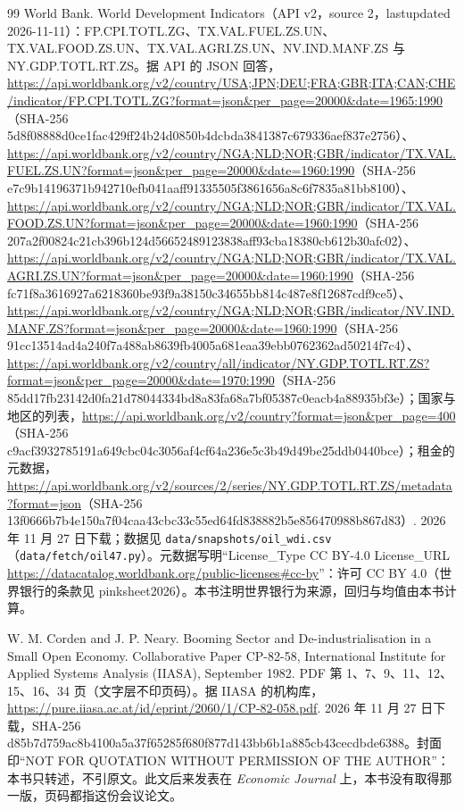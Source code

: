 \begin{thebibliography}{99}
 World Bank. World Development Indicators（API v2，source 2，lastupdated 2026-11-11）：FP.CPI.TOTL.ZG、TX.VAL.FUEL.ZS.UN、TX.VAL.FOOD.ZS.UN、TX.VAL.AGRI.ZS.UN、NV.IND.MANF.ZS 与 NY.GDP.TOTL.RT.ZS。据 API 的 JSON 回答，\url{https://api.worldbank.org/v2/country/USA;JPN;DEU;FRA;GBR;ITA;CAN;CHE/indicator/FP.CPI.TOTL.ZG?format=json&per_page=20000&date=1965:1990}（SHA-256 5d8f08888d0ce1fac429ff24b24d0850b4dcbda3841387c679336aef837e2756）、\url{https://api.worldbank.org/v2/country/NGA;NLD;NOR;GBR/indicator/TX.VAL.FUEL.ZS.UN?format=json&per_page=20000&date=1960:1990}（SHA-256 e7c9b14196371b942710efb041aaff91335505f3861656a8c6f7835a81bb8100）、\url{https://api.worldbank.org/v2/country/NGA;NLD;NOR;GBR/indicator/TX.VAL.FOOD.ZS.UN?format=json&per_page=20000&date=1960:1990}（SHA-256 207a2f00824c21cb396b124d56652489123838aff93cba18380cb612b30afc02）、\url{https://api.worldbank.org/v2/country/NGA;NLD;NOR;GBR/indicator/TX.VAL.AGRI.ZS.UN?format=json&per_page=20000&date=1960:1990}（SHA-256 fc71f8a3616927a6218360be93f9a38150c34655bb814c487e8f12687cdf9ce5）、\url{https://api.worldbank.org/v2/country/NGA;NLD;NOR;GBR/indicator/NV.IND.MANF.ZS?format=json&per_page=20000&date=1960:1990}（SHA-256 91cc13514ad4a240f7a488ab8639fb4005a681eaa39ebb0762362ad50214f7c4）、\url{https://api.worldbank.org/v2/country/all/indicator/NY.GDP.TOTL.RT.ZS?format=json&per_page=20000&date=1970:1990}（SHA-256 85dd17fb23142d0fa21d78044334bd8a83fa68a7bf05387c0eacb4a88935bf3e）；国家与地区的列表，\url{https://api.worldbank.org/v2/country?format=json&per_page=400}（SHA-256 c9acf3932785191a649cbc04c3056af4cf64a236e5c3b49d49be25ddb0440bce）；租金的元数据，\url{https://api.worldbank.org/v2/sources/2/series/NY.GDP.TOTL.RT.ZS/metadata?format=json}（SHA-256 13f0666b7b4e150a7f04caa43cbc33c55ed64fd838882b5e856470988b867d83）. 2026 年 11 月 27 日下载；数据见 \texttt{data/snapshots/oil\_wdi.csv}（\texttt{data/fetch/oil47.py}）。元数据写明“License\_Type CC BY-4.0 License\_URL \url{https://datacatalog.worldbank.org/public-licenses#cc-by}”：许可 CC BY 4.0（世界银行的条款见 pinksheet2026）。本书注明世界银行为来源，回归与均值由本书计算。

 W. M. Corden and J. P. Neary. Booming Sector and De-industrialisation in a Small Open Economy. Collaborative Paper CP-82-58, International Institute for Applied Systems Analysis (IIASA), September 1982. PDF 第 1、7、9、11、12、15、16、34 页（文字层不印页码）。据 IIASA 的机构库，\url{https://pure.iiasa.ac.at/id/eprint/2060/1/CP-82-058.pdf}. 2026 年 11 月 27 日下载，SHA-256 d85b7d759ac8b4100a5a37f65285f680f877d143bb6b1a885cb43cecdbde6388。封面印“NOT FOR QUOTATION WITHOUT PERMISSION OF THE AUTHOR”：本书只转述，不引原文。此文后来发表在 \emph{Economic Journal} 上，本书没有取得那一版，页码都指这份会议论文。


\end{thebibliography}
